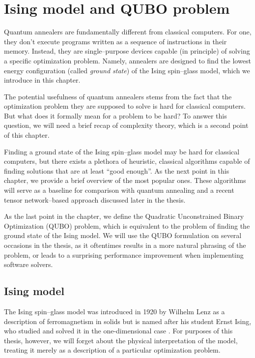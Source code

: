 \chapter{Ising model and QUBO problem}
\label{chapter:ising}

Quantum annealers are fundamentally different from classical computers. For
one, they don't execute programs written as a sequence of instructions in their
memory. Instead, they are single--purpose devices capable (in principle) of
solving a specific optimization problem. Namely, annealers are designed to find
the lowest energy configuration (called \emph{ground state}) of the Ising
spin--glass model, which we introduce in this chapter.

The potential usefulness of quantum annealers stems from the fact that the
optimization problem they are supposed to solve is hard for classical
computers. But what does it formally mean for a problem to be hard? To answer
this question, we will need a brief recap of complexity theory, which is a
second point of this chapter.

Finding a ground state of the Ising spin--glass model may be hard for classical
computers, but there exists a plethora of heuristic, classical algorithms
capable of finding solutions that are at least ``good enough''. As the next
point in this chapter, we provide a brief overview of the most popular ones.
These algorithms will serve as a baseline for comparison with quantum annealing
and a recent tensor network--based approach discussed later in the thesis.

As the last point in the chapter, we define the Quadratic Unconstrained Binary
Optimization (QUBO) problem, which is equivalent to the problem of finding the
ground state of the Ising model. We will use the QUBO formulation on several
occasions in the thesis, as it oftentimes results in a more natural phrasing of
the problem, or leads to a surprising performance improvement when implementing
software solvers.

\section{Ising model}

The Ising spin--glass model was introduced in 1920 by Wilhelm Lenz \cite{lenz}
as a description of ferromagnetism in solids but is named after his student
Ernst Ising, who studied and solved it in the one-dimensional case
\cite{ising}. For purposes of this thesis, however, we will forget about the
physical interpretation of the model, treating it merely as a description of a
particular optimization problem.

